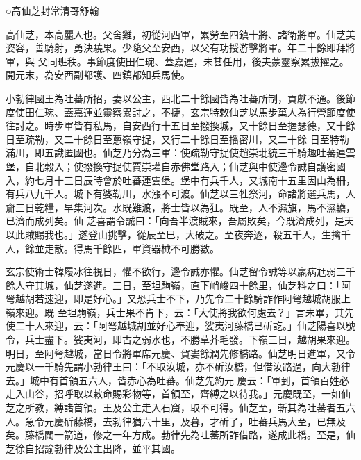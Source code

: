 
\begin{pinyinscope}

 ○高仙芝封常清哥舒翰



 高仙芝，本高麗人也。父舍雞，初從河西軍，累勞至四鎮十將、諸衛將軍。仙芝美姿容，善騎射，勇決驍果。少隨父至安西，以父有功授游擊將軍。年二十餘即拜將軍，與
 父同班秩。事節度使田仁琬、蓋嘉運，未甚任用，後夫蒙靈察累拔擢之。開元末，為安西副都護、四鎮都知兵馬使。



 小勃律國王為吐蕃所招，妻以公主，西北二十餘國皆為吐蕃所制，貢獻不通。後節度使田仁琬、蓋嘉運並靈察累討之，不捷，玄宗特敕仙芝以馬步萬人為行營節度使往討之。時步軍皆有私馬，自安西行十五日至撥換城，又十餘日至握瑟德，又十餘日至疏勒，又二十餘日至蔥嶺守捉，又行二十餘日至播密川，又二十餘
 日至特勒滿川，即五識匿國也。仙芝乃分為三軍：使疏勒守捉使趙崇玭統三千騎趣吐蕃連雲堡，自北穀入；使撥換守捉使賈崇瓘自赤佛堂路入；仙芝與中使邊令誠自護密國入，約七月十三日辰時會於吐蕃連雲堡。堡中有兵千人，又城南十五里因山為柵，有兵八九千人。城下有婆勒川，水漲不可渡。仙芝以三牲祭河，命諸將選兵馬，人齎三日乾糧，早集河次。水既難渡，將士皆以為狂。既至，人不濕旗，馬不濕韉，已濟而成列矣。仙
 芝喜謂令誠曰：「向吾半渡賊來，吾屬敗矣，今既濟成列，是天以此賊賜我也。」遂登山挑擊，從辰至巳，大破之。至夜奔逐，殺五千人，生擒千人，餘並走散。得馬千餘匹，軍資器械不可勝數。



 玄宗使術士韓履冰往視日，懼不欲行，邊令誠亦懼。仙芝留令誠等以羸病尪弱三千餘人守其城，仙芝遂進。三日，至坦駒嶺，直下峭峻四十餘里，仙芝料之曰：「阿弩越胡若速迎，即是好心。」又恐兵士不下，乃先令二十餘騎詐作阿弩越城胡服上嶺來迎。既
 至坦駒嶺，兵士果不肯下，云：「大使將我欲何處去？」言未畢，其先使二十人來迎，云：「阿弩越城胡並好心奉迎，娑夷河藤橋已斫訖。」仙芝陽喜以號令，兵士盡下。娑夷河，即古之弱水也，不勝草芥毛發。下嶺三日，越胡果來迎。明日，至阿弩越城，當日令將軍席元慶、賀婁餘潤先修橋路。仙芝明日進軍，又令元慶以一千騎先謂小勃律王曰：「不取汝城，亦不斫汝橋，但借汝路過，向大勃律去。」城中有首領五六人，皆赤心為吐蕃。仙芝先約元
 慶云：「軍到，首領百姓必走入山谷，招呼取以敕命賜彩物等，首領至，齊縛之以待我。」元慶既至，一如仙芝之所教，縛諸首領。王及公主走入石窟，取不可得。仙芝至，斬其為吐蕃者五六人。急令元慶斫藤橋，去勃律猶六十里，及暮，才斫了，吐蕃兵馬大至，已無及矣。藤橋闊一箭道，修之一年方成。勃律先為吐蕃所詐借路，遂成此橋。至是，仙芝徐自招諭勃律及公主出降，並平其國。




\end{pinyinscope}
